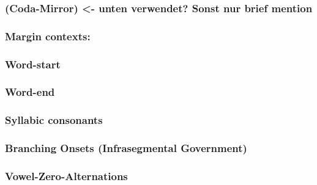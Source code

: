 \subsubsection{(Coda-Mirror) <- unten verwendet? Sonst nur brief mention}
\TODO{}

\subsubsection{Margin contexts:}
\subsubsection{Word-start \ctx{\#\_}}\label{intro:obj:word start}
\begin{structure}{}
  \wordstart

\end{structure}
\TODO{}

\subsubsection{Word-end \ctx{\_\#}}\label{intro:obj:word end}
\TODO{}

\subsubsection{Syllabic consonants}
\TODO{}

\subsubsection{Branching Onsets (Infrasegmental Government)}
\TODO{}

\subsubsection{Vowel-Zero-Alternations}
\TODO{}